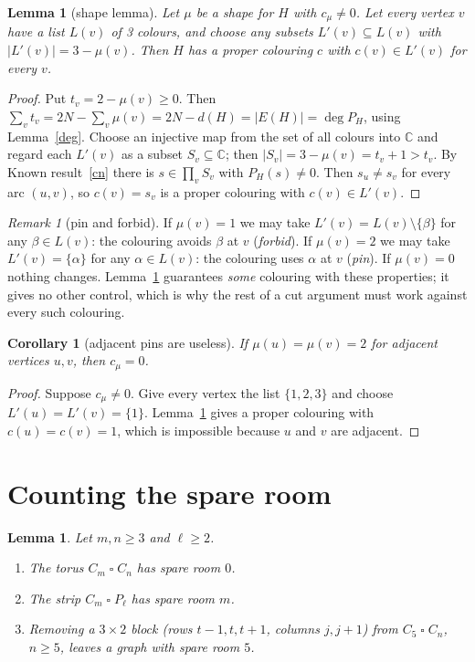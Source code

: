 \documentclass[11pt]{article}
\theoremstyle{plain}
\newtheorem{lemma}[theorem]{Lemma}
\newtheorem{corollary}[theorem]{Corollary}
\theoremstyle{definition}
\theoremstyle{remark}
\newtheorem{remark}[theorem]{Remark}
\newcommand{\T}{\mathbin{\square}}
\begin{document}
\begin{lemma}[shape lemma]\label{shape}
Let $\mu$ be a shape for $H$ with $c_\mu \ne 0$. Let every vertex $v$ have a list $L(v)$ of 3 colours, and
choose any subsets $L'(v) \subseteq L(v)$ with $|L'(v)| = 3 - \mu(v)$. Then $H$ has a proper colouring $c$
with $c(v) \in L'(v)$ for every $v$.
\end{lemma}

\begin{proof}
Put $t_v = 2 - \mu(v) \ge 0$. Then $\sum_v t_v = 2N - \sum_v \mu(v) = 2N - d(H) = |E(H)| = \deg P_H$, using
Lemma~\ref{deg}. Choose an injective map from the set of all colours into $\mathbb{C}$ and regard each $L'(v)$
as a subset $S_v \subseteq \mathbb{C}$; then $|S_v| = 3 - \mu(v) = t_v + 1 > t_v$. By Known result~\ref{cn} there is
$s \in \prod_v S_v$ with $P_H(s) \ne 0$. Then $s_u \ne s_v$ for every arc $(u, v)$, so $c(v) = s_v$ is a proper
colouring with $c(v) \in L'(v)$.
\end{proof}

\begin{remark}[pin and forbid]
If $\mu(v) = 1$ we may take $L'(v) = L(v) \setminus \{\beta\}$ for any $\beta \in L(v)$: the colouring avoids
$\beta$ at $v$ (\emph{forbid}). If $\mu(v) = 2$ we may take $L'(v) = \{\alpha\}$ for any $\alpha \in L(v)$: the
colouring uses $\alpha$ at $v$ (\emph{pin}). If $\mu(v) = 0$ nothing changes. Lemma~\ref{shape} guarantees
\emph{some} colouring with these properties; it gives no other control, which is why the rest of a cut
argument must work against every such colouring.
\end{remark}

\begin{corollary}[adjacent pins are useless]\label{adjpin}
If $\mu(u) = \mu(v) = 2$ for adjacent vertices $u, v$, then $c_\mu = 0$.
\end{corollary}

\begin{proof}
Suppose $c_\mu \ne 0$. Give every vertex the list $\{1, 2, 3\}$ and choose $L'(u) = L'(v) = \{1\}$. Lemma~\ref{shape}
gives a proper colouring with $c(u) = c(v) = 1$, which is impossible because $u$ and $v$ are adjacent.
\end{proof}

\section{Counting the spare room}

\begin{lemma}\label{counts}
Let $m, n \ge 3$ and $\ell \ge 2$.
\begin{enumerate}[label=(\alph*)]
\item The torus $C_m \T C_n$ has spare room $0$.
\item The strip $C_m \T P_\ell$ has spare room $m$.
\item Removing a $3 \times 2$ block (rows $t-1, t, t+1$, columns $j, j+1$) from $C_5 \T C_n$, $n \ge 5$, leaves a
graph with spare room $5$.
\end{enumerate}
\end{lemma}
\end{document}
